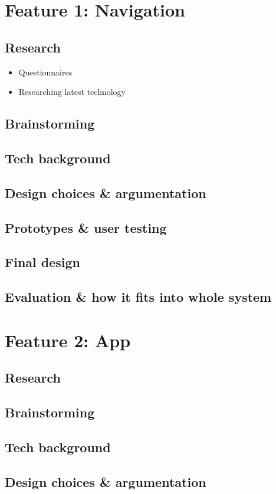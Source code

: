 \documentclass{article}
\begin{document}
\section{Feature 1: Navigation}
\subsection{Research}
\begin{itemize}
	\item Questionnaires
    \item Researching latest technology
\end{itemize}
\subsection{Brainstorming}
\subsection{Tech background}
\subsection{Design choices \& argumentation}
\subsection{Prototypes \& user testing}
\subsection{Final design}
\subsection{Evaluation \& how it fits into whole system}

\section{Feature 2: App}
\subsection{Research}
\subsection{Brainstorming}
\subsection{Tech background}
\subsection{Design choices \& argumentation}
\end{document}
